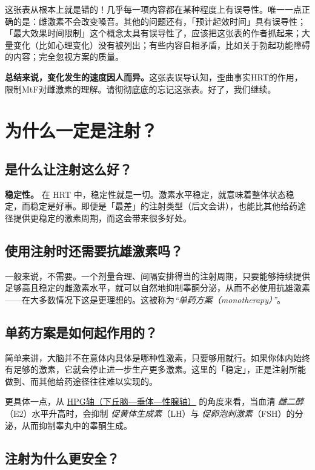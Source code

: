 \documentclass{article}
\begin{document}
这张表从根本上就是错的！几乎每一项内容都在某种程度上有误导性。唯一一点正确的是：雌激素不会改变嗓音。其他的问题还有，「预计起效时间」具有误导性；「最大效果时间限制」这个概念太具有误导性了，应该把这张表的作者抓起来；大量变化（比如心理变化）没有被列出；有些内容自相矛盾，比如关于勃起功能障碍的内容；完全忽视方案的质量。

\textbf{总结来说，变化发生的速度因人而异。}这张表误导认知，歪曲事实HRT的作用，限制MtF对雌激素的理解。请彻彻底底的忘记这张表。好了，我们继续。

\section{为什么一定是注射？}

\subsection{是什么让注射这么好？}

\textbf{稳定性。} 在 HRT 中，稳定性就是一切。激素水平稳定，就意味着整体状态稳定，而稳定是好事。即便是「最差」的注射类型（后文会讲），也能比其他给药途径提供更稳定的激素周期，而这会带来很多好处。

\subsection{使用注射时还需要抗雄激素吗？}

一般来说，不需要。一个剂量合理、间隔安排得当的注射周期，只要能够持续提供足够高且稳定的雌激素水平，就可以自然地抑制睾酮分泌，从而不必使用抗雄激素——在大多数情况下这是更理想的。这被称为\textit{“单药方案（monotherapy）”}。

\subsection{单药方案是如何起作用的？}\label{2-3}

简单来讲，大脑并不在意体内具体是哪种性激素，只要够用就行。如果你体内始终有足够的激素，它就会停止进一步生产更多激素。这里的「稳定」，正是注射所能做到、而其他给药途径往往难以实现的。

更具体一点，从 \href{https://en.wikipedia.org/wiki/Hypothalamic-pituitary-gonadal_axis}{HPG轴（下丘脑—垂体—性腺轴）} 的角度来看，当血清 \textit{雌二醇}（E2）水平升高时，会抑制 \textit{促黄体生成素}（LH）与 \textit{促卵泡刺激素}（FSH）的分泌，从而抑制睾丸中的睾酮生成。

\subsection{注射为什么更安全？}
\end{document}
